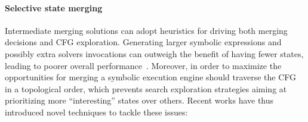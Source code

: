 \paragraph{Selective state merging} Intermediate merging solutions can adopt heuristics for driving both merging decisions and CFG exploration. Generating larger symbolic expressions and possibly extra solvers invocations can outweigh the benefit of having fewer states, leading to poorer overall performance~\cite{HSS-RV09,KKB-PLDI12}. Moreover, in order to maximize the opportunities for merging a symbolic execution engine should traverse the CFG in a topological order, which prevents search exploration strategies aiming at prioritizing more ``interesting'' states over others. %
Recent works have thus introduced novel techniques to tackle these issues: 
